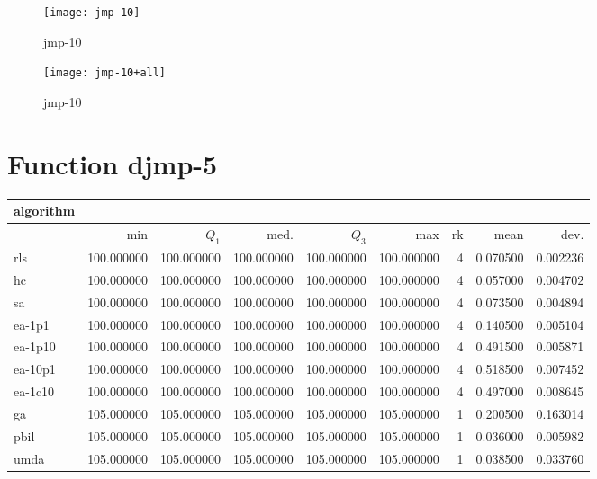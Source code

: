 \begin{center}
\begin{figure}[h]
\centering
\texttt{[image: jmp-10]}
\caption{jmp-10}
\end{figure}
\end{center}

\begin{center}
\begin{figure}[h]
\centering
\texttt{[image: jmp-10+all]}
\caption{jmp-10}
\end{figure}
\end{center}

\newpage

\section{Function djmp-5}
\begin{center}
\begin{tabular}{@{}l*{5}{>{{}}N{3}{0}}>{{}}N{2}{0}N{1}{3}N{1}{3}@{}}
\toprule
{algorithm} &  &  \\
\midrule
& {min} & {$Q_1$} & {med.} & {$Q_3$} & {max} & {rk} & {mean} & {dev.} \\
\midrule
rls & 100.000000 & 100.000000 & 100.000000 & 100.000000 & 100.000000 & 4 & 0.070500 & 0.002236 \\
 hc & 100.000000 & 100.000000 & 100.000000 & 100.000000 & 100.000000 & 4 & 0.057000 & 0.004702 \\
 sa & 100.000000 & 100.000000 & 100.000000 & 100.000000 & 100.000000 & 4 & 0.073500 & 0.004894 \\
 ea-1p1 & 100.000000 & 100.000000 & 100.000000 & 100.000000 & 100.000000 & 4 & 0.140500 & 0.005104 \\
 ea-1p10 & 100.000000 & 100.000000 & 100.000000 & 100.000000 & 100.000000 & 4 & 0.491500 & 0.005871 \\
 ea-10p1 & 100.000000 & 100.000000 & 100.000000 & 100.000000 & 100.000000 & 4 & 0.518500 & 0.007452 \\
 ea-1c10 & 100.000000 & 100.000000 & 100.000000 & 100.000000 & 100.000000 & 4 & 0.497000 & 0.008645 \\
 ga & {\color{blue}} 105.000000 & {\color{blue}} 105.000000 & {\color{blue}} 105.000000 & {\color{blue}} 105.000000 & {\color{blue}} 105.000000 & 1 & 0.200500 & 0.163014 \\
 pbil & {\color{blue}} 105.000000 & {\color{blue}} 105.000000 & {\color{blue}} 105.000000 & {\color{blue}} 105.000000 & {\color{blue}} 105.000000 & 1 & 0.036000 & 0.005982 \\
 umda & {\color{blue}} 105.000000 & {\color{blue}} 105.000000 & {\color{blue}} 105.000000 & {\color{blue}} 105.000000 & {\color{blue}} 105.000000 & 1 & 0.038500 & 0.033760 \\
 \bottomrule
\end{tabular}
\end{center}

